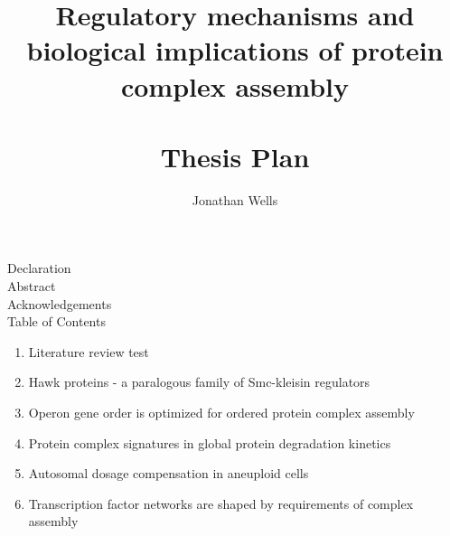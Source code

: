 \documentclass{report}
\begin{document}
\title{Regulatory mechanisms and biological implications of protein complex assembly\\~\\
Thesis Plan}
\author{Jonathan Wells}
\date{}
\maketitle

\noindent
Declaration\\
Abstract\\
Acknowledgements\\
Table of Contents
\begin{enumerate}
    \item Literature review
     test

    \item Hawk proteins - a paralogous family of Smc-kleisin regulators

    \item Operon gene order is optimized for ordered protein complex assembly

    \item Protein complex signatures in global protein degradation kinetics

    \item Autosomal dosage compensation in aneuploid cells

    \item Transcription factor networks are shaped by requirements of complex assembly
\end{enumerate}
\end{document}
